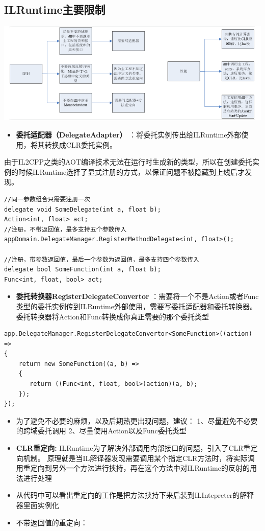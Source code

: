 \documentclass[9pt, b5paper]{article}
\begin{document}
\subsection{ILRuntime主要限制}
\label{sec-4-3}

\includegraphics[width=.9\linewidth]{./pic/readme_20220926_095555.png}
\begin{itemize}
\item \textbf{委托适配器（DelegateAdapter）} ：将委托实例传出给ILRuntime外部使用，将其转换成CLR委托实例。
\end{itemize}
由于IL2CPP之类的AOT编译技术无法在运行时生成新的类型，所以在创建委托实例的时候ILRuntime选择了显式注册的方式，以保证问题不被隐藏到上线后才发现。
\begin{verbatim}
//同一参数组合只需要注册一次
delegate void SomeDelegate(int a, float b);
Action<int, float> act;
//注册，不带返回值，最多支持五个参数传入
appDomain.DelegateManager.RegisterMethodDelegate<int, float>();

//注册，带参数返回值，最后一个参数为返回值，最多支持四个参数传入
delegate bool SomeFunction(int a, float b);
Func<int, float, bool> act;
\end{verbatim}
\begin{itemize}
\item \textbf{委托转换器RegisterDelegateConvertor} ：需要将一个不是Action或者Func类型的委托实例传到ILRuntime外部使用，需要写委托适配器和委托转换器。委托转换器将Action和Func转换成你真正需要的那个委托类型
\end{itemize}
\begin{verbatim}
app.DelegateManager.RegisterDelegateConvertor<SomeFunction>((action) =>
{
    return new SomeFunction((a, b) =>
    {
       return ((Func<int, float, bool>)action)(a, b);
    });
});
\end{verbatim}
\begin{itemize}
\item 为了避免不必要的麻烦，以及后期热更出现问题，建议： 1、尽量避免不必要的跨域委托调用 2、尽量使用Action以及Func委托类型
\item \textbf{CLR重定向:} ILRuntime为了解决外部调用内部接口的问题，引入了CLR重定向机制。 原理就是当IL解译器发现需要调用某个指定CLR方法时，将实际调用重定向到另外一个方法进行挟持，再在这个方法中对ILRuntime的反射的用法进行处理
\item 从代码中可以看出重定向的工作是把方法挟持下来后装到ILIntepreter的解释器里面实例化
\item 不带返回值的重定向：
\end{itemize}
\end{document}
